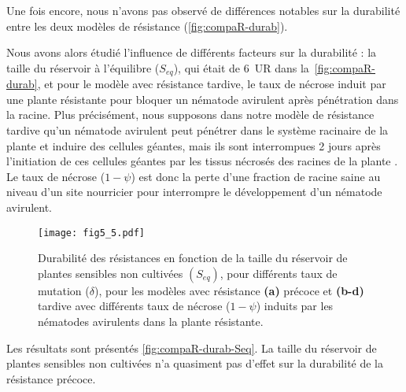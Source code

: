 	
	
	Une fois encore, nous n'avons pas observé de différences notables sur la durabilité entre les deux modèles de résistance (\autoref{fig:compaR-durab}). 
	
	Nous avons alors étudié l'influence de différents facteurs sur la durabilité : la taille du réservoir à l'équilibre ($S_{eq}$), qui était de 6~UR dans la~\autoref{fig:compaR-durab},  et pour le modèle avec résistance tardive, le taux de nécrose induit par une plante résistante pour bloquer un nématode avirulent après pénétration dans la racine. Plus précisément,   nous supposons  dans notre modèle de  résistance tardive qu'un nématode avirulent peut pénétrer
dans le système racinaire de la plante et induire des cellules géantes, mais ils sont interrompues 2 jours
après l'initiation de ces cellules géantes par les tissus nécrosés des racines de la plante \citep{Pegard2005}.  Le taux de nécrose ($1-\psi$) est  donc la perte d'une fraction de racine saine au niveau d'un site nourricier pour interrompre le développement d'un nématode avirulent.
	   
   \begin{figure}
	 \centering \texttt{[image: fig5\_5.pdf]}
	  \caption[Durabilité des résistances en fonction de la taille du réservoir]{Durabilité des résistances en fonction 
	  de la taille du réservoir de plantes sensibles non cultivées $(S_{eq})$, pour différents taux de mutation ($
	  \delta$), pour les modèles avec résistance  \textbf{(a)} précoce et  \textbf{(b-d)} tardive avec différents taux 
	  de nécrose ($1-\psi$) induits par les nématodes avirulents dans la plante résistante.}
	  \label{fig:compaR-durab-Seq}
   \end{figure}
	
	
	
	Les résultats sont présentés \autoref{fig:compaR-durab-Seq}. La taille du réservoir de plantes sensibles non cultivées n'a quasiment pas d'effet sur la durabilité de la résistance précoce.
	
